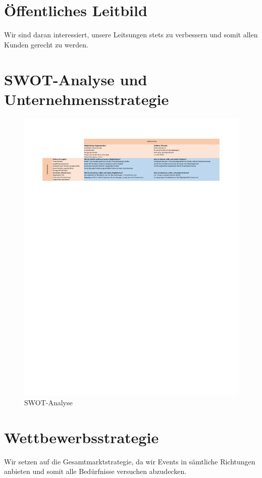 \documentclass[a4paper, titlepage]{article}
\begin{document}
\section{Öffentliches Leitbild}
Wir sind daran interessiert, unsere Leitsungen stets zu verbessern und somit allen Kunden gerecht zu werden.
\section{SWOT-Analyse und Unternehmensstrategie}
\begin{figure}[H]
  \includegraphics[width=\textwidth]{swot_analysis}
  \caption{SWOT-Analyse}
\end{figure}


\section{Wettbewerbsstrategie}
Wir setzen auf die Gesamtmarktstrategie, da wir Events in sämtliche Richtungen anbieten und somit alle Bedürfnisse versuchen abzudecken.
\end{document}
